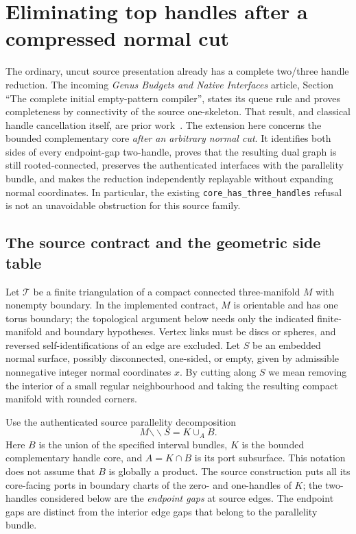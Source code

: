 \section{Eliminating top handles after a compressed normal cut}
\label{sec:cut-dual}

The ordinary, uncut source presentation already has a complete two/three
handle reduction.  The incoming \emph{Genus Budgets and Native Interfaces}
article, Section ``The complete initial empty-pattern compiler'', states
its queue rule and proves completeness by connectivity of the source
one-skeleton.  That result, and classical handle cancellation itself, are
prior work~\cite{prior-genus}.  The extension here concerns the bounded complementary core
\emph{after an arbitrary normal cut}.  It identifies both sides of every
endpoint-gap two-handle, proves that the resulting dual graph is still
rooted-connected, preserves the authenticated interfaces with the
parallelity bundle, and makes the reduction independently replayable
without expanding normal coordinates.  In particular, the existing
\texttt{core\_has\_three\_handles} refusal is not an unavoidable obstruction
for this source family.

\subsection{The source contract and the geometric side table}

Let $\mathcal T$ be a finite triangulation of a compact connected
three-manifold $M$ with nonempty boundary.  In the implemented contract,
$M$ is orientable and has one torus boundary; the topological argument
below needs only the indicated finite-manifold and boundary hypotheses.
Vertex links must be discs or spheres, and reversed self-identifications
of an edge are excluded.  Let $S$ be an embedded normal surface, possibly
disconnected, one-sided, or empty, given by admissible nonnegative integer
normal coordinates $x$.  By cutting along $S$ we mean removing the
interior of a small regular neighbourhood and taking the resulting compact
manifold with rounded corners.

Use the authenticated source parallelity decomposition
\[
  M\mathbin{\backslash\!\backslash}S=K\cup_A B.
\]
Here $B$ is the union of the specified interval bundles, $K$ is the bounded
complementary handle core, and $A=K\cap B$ is its port subsurface.  This
notation does not assume that $B$ is globally a product.  The source
construction puts all its core-facing ports in boundary charts of the
zero- and one-handles of $K$; the two-handles considered below are the
\emph{endpoint gaps} at source edges.  The endpoint gaps are distinct from
the interior edge gaps that belong to the parallelity bundle.

